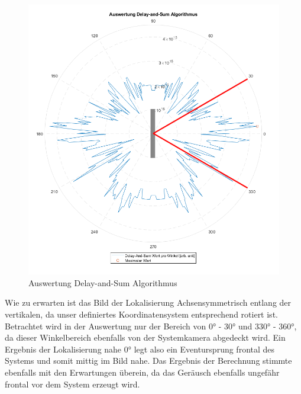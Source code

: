 \begin{figure}[!h]
	\begin{center}
		\includegraphics[scale=0.3]{Sections/Tests/Test_6_b}
	\end{center}
	\caption{Auswertung Delay-and-Sum Algorithmus}
	\label{fig:Test_6_b}
\end{figure}

Wie zu erwarten ist das Bild der Lokalisierung Achsensymmetrisch entlang der vertikalen, da unser definiertes Koordinatensystem entsprechend rotiert ist. Betrachtet wird in der Auswertung nur der Bereich von \ang{0} - \ang{30} und \ang{330} - \ang{360}, da dieser Winkelbereich ebenfalls von der Systemkamera abgedeckt wird. Ein Ergebnis der Lokalisierung nahe \ang{0} legt also ein Eventursprung frontal des Systems und somit mittig im Bild nahe. Das Ergebnis der Berechnung stimmte ebenfalls mit den Erwartungen überein, da das Geräusch ebenfalls ungefähr frontal vor dem System erzeugt wird.

